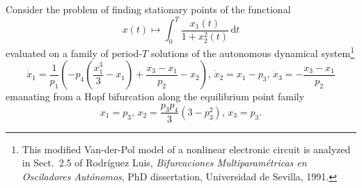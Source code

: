 Consider the problem of finding stationary points of the functional
\begin{equation}
x(t)\mapsto\int_0^T \frac{x_1(t)}{1+x_2^2(t)}\,\mathrm{d}t
\end{equation}
evaluated on a family of period-$T$ solutions of the autonomous dynamical system\footnote{This modified Van-der-Pol model of a nonlinear electronic circuit is analyzed in Sect.~2.5 of Rodr\'{i}guez Luis, \emph{Bifurcaciones Multiparam\'{e}tricas en Osciladores Aut\'{o}nomos}, PhD dissertation, Universidad de Sevilla, 1991.}
\begin{equation}
\dot{x}_1=\frac{1}{p_1}\left(-p_4\left(\frac{x_1^3}{3}-x_1\right)+\frac{x_3-x_1}{p_2}-x_2\right),\,\dot{x}_2=x_1-p_3,\,\dot{x}_3=-\frac{x_3-x_1}{p_2}
\end{equation}
emanating from a Hopf bifurcation along the equilibrium point family
\begin{equation}
x_1=p_3,\,x_2=\frac{p_3p_4}{3}(3-p_3^2),\,x_3=p_3.
\end{equation}

